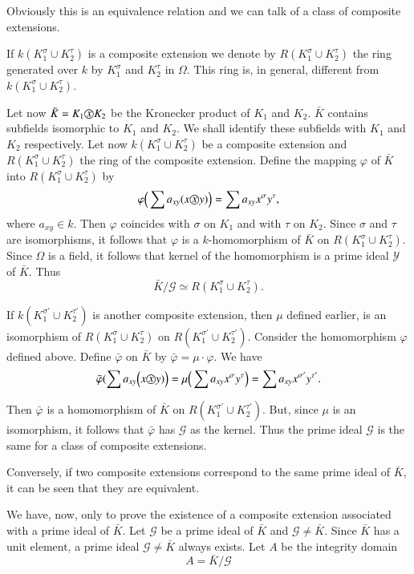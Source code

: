 Obviously this is an equivalence relation and we can talk of a class
of composite extensions. 

If $k(K^\sigma_1  \cup  K^\tau_2)$ is a composite extension we
denote by $R(K^\sigma_1  \cup  K^\tau_2)$ the ring generated over
$k$ by $K^\sigma_1$ and $K^{\tau}_2$ in $\Omega$. This ring is, in
general, different from $k(K^\sigma_1  \cup  K^\tau_2)$. 

Let now $\bar{K} = K_1  \text{\textcircled{$x$}}  K_2$ be the Kronecker product
of $K_1$ and $K_2$. $\bar{K}$ contains subfields isomorphic to $K_1$ and
$K_2$. We shall identify these subfields with $K_1$ and $K_2$
respectively. Let now $k(K^\sigma_1  \cup  K^\tau_2)$ be a composite
extension and $R(K^\sigma_1  \cup  K^\tau_2)$ the ring\pageoriginale
of the composite extension. Define the mapping $\varphi$ of $\bar{K}$ into
$R(K^\sigma_1  \cup  K^\tau_2)$ by  
$$
\varphi \Big(\sum a_{xy}  (x  \text{\textcircled{$x$}} y)\Big) = \sum a_{xy}
x^\sigma  y^\tau, 
$$
where $a_{xy}  \in  k$. Then $\varphi$ coincides with $\sigma$ on
$K_1$ and with $\tau$ on $K_2$. Since $\sigma$ and $\tau$ are
isomorphisms, it follows that $\varphi$ is a $k$-homomorphism of
$\bar{K}$ on $R(K^\sigma_1  \cup  K^\tau_2)$. Since $\Omega$ is a
field, it follows that kernel of the homomorphism is a prime ideal
$\mathscr{Y}$ of $\bar{K}$. Thus 
$$
\bar{K}/\mathscr{G} \simeq R(K_1^\sigma  \cup  K^\tau_2).
$$

If $k(K^{\sigma'}_1  \cup K^{\tau'}_2)$ is another composite
extension, then $\mu$ defined earlier, is an isomorphism of
$R(K^\sigma_1  \cup  K^\tau_2)$ on $R(K^{\sigma'}_1  \cup
K^{\tau'}_2)$. Consider the homomorphism $\varphi$ defined
above. Define $\bar{\varphi}$ on $\bar{K}$ by $\bar{\varphi} =
\mu\cdot\varphi$. We have 
$$
\bar{\varphi}(\sum a_{xy} \Big(x  \text{\textcircled{$x$}}  y)\Big) = \mu
\Big(\sum a_{xy}  x^\sigma  y^\tau \Big) = \sum a_{xy}  x^{\sigma'}
y^{\tau'}. 
$$

Then $\bar{\varphi}$ is a homomorphism of $\bar{K}$ on
$R(K^{\sigma'}_1 \cup K^{\tau'}_2)$. But, since $\mu$ is an
isomorphism, it follows that $\bar{\varphi}$ has $\mathscr{G}$ as the
kernel. Thus the prime ideal $\mathscr{G}$ is the same for a class of
composite extensions. 

Conversely, if two composite extensions correspond to the same prime
ideal of $\bar{K}$, it can be seen that they are equivalent. 

We have, now, only to prove the existence of a composite extension
associated with a prime ideal of $\bar{K}$. Let $\mathscr{G}$ be a
prime ideal of $\bar{K}$ and $\mathscr{G} \neq \bar{K}$. Since
$\bar{K}$ has a unit element, a prime ideal $\mathscr{G} \neq \bar{K}$
always exists. Let $A$ be the integrity domain 
$$
A = \bar{K}/\mathscr{G}
$$\pageoriginale

